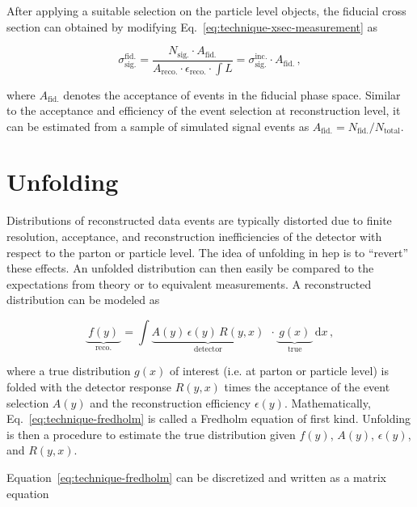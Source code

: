 After applying a suitable selection on the particle level objects, the fiducial cross section can obtained by modifying Eq.~\ref{eq:technique-xsec-measurement} as

\begin{equation}
\sigma_\mathrm{sig.}^\mathrm{fid.}=\frac{N_\mathrm{sig.}\cdot A_\mathrm{fid.}}{A_\mathrm{reco.}\cdot\epsilon_\mathrm{reco.}\cdot{\textstyle{\int}L}} =\sigma_\mathrm{sig.}^\mathrm{inc.}\cdot A_\mathrm{fid.}\,,
\end{equation}

where $A_\mathrm{fid.}$ denotes the acceptance of events in the fiducial phase space. Similar to the acceptance and efficiency of the event selection at reconstruction level, it can be estimated from a sample of simulated signal events as $A_\mathrm{fid.}=N_\mathrm{fid.}/N_\mathrm{total}$. 



\section{Unfolding}

Distributions of reconstructed data events are typically distorted due to finite resolution, acceptance, and reconstruction inefficiencies of the detector with respect to the parton or particle level. The idea of unfolding in \gls{hep} is to ``revert'' these effects. An unfolded distribution can then easily be compared to the expectations from theory or to equivalent measurements. A reconstructed distribution can be modeled as

\begin{equation}
\underbrace{~f(y)~}_\mathrm{reco.}=\int \underbrace{A(y)\,\epsilon(y)\, R(y,x)}_\mathrm{detector}~~\cdot \underbrace{~g(x)~}_\mathrm{true}\, \mathrm{d}x\,, \label{eq:technique-fredholm}
\end{equation}

where a true distribution $g(x)$ of interest (i.e. at parton or particle level) is folded with the detector response $R(y,x)$ times the acceptance of the event selection $A(y)$ and the reconstruction efficiency $\epsilon(y)$. Mathematically, Eq.~\ref{eq:technique-fredholm} is called a Fredholm equation of first kind. Unfolding is then a procedure to estimate the true distribution given $f(y)$, $A(y)$, $\epsilon(y)$, and $R(y,x)$. 

Equation~\ref{eq:technique-fredholm} can be discretized and written as a matrix equation

